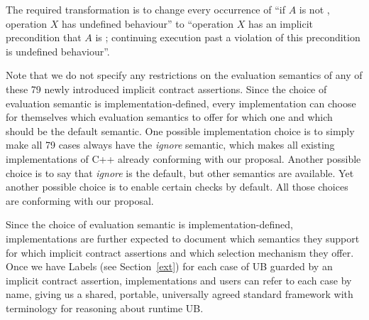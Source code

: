 The required transformation is to change every occurrence of “if $A$ is not , operation $X$ has undefined behaviour'' to ``operation $X$ has an implicit precondition that $A$ is ; continuing execution past a violation of this precondition is undefined behaviour''.

Note that we do not specify any restrictions on the evaluation semantics of any of these 79 newly introduced  implicit contract assertions. Since the choice of evaluation semantic is implementation-defined, every implementation can choose for themselves which evaluation semantics to offer for which one and which should be the default semantic. One possible implementation choice is to simply make all 79 cases always have the \emph{ignore} semantic, which makes all existing implementations of C++ already conforming with our proposal. Another possible choice is to say that  \emph{ignore} is the default, but other semantics are available. Yet another possible choice is to enable certain checks by default. All those choices are conforming with our proposal.

Since the choice of evaluation semantic is  implementation-defined, implementations are further expected to document which semantics they support for which implicit contract assertions and which selection mechanism they offer. Once we have Labels (see Section~\ref{ext}) for each case of UB guarded by an implicit contract assertion, implementations and users can refer to each case by name, giving us a shared, portable, universally agreed standard framework with terminology for reasoning about runtime UB.

